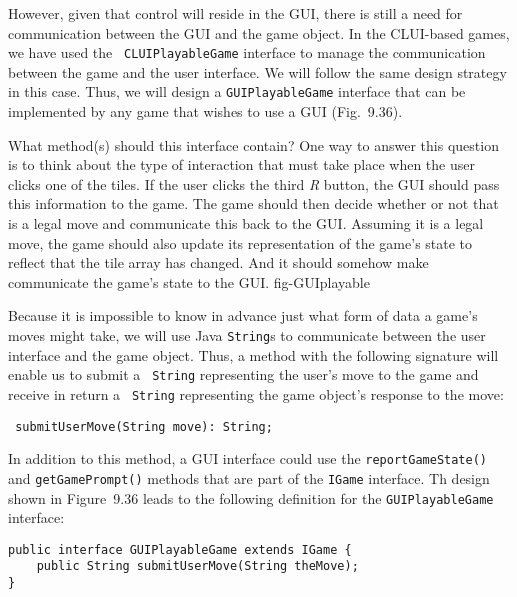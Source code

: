 However, given that control will reside in the GUI, there is still a
need for communication between the GUI and the game
object. In the CLUI-based games, we have used the {\tt
CLUIPlayableGame} interface to manage the communication between the
game and the user interface.  We will follow the same design strategy
in this case.  Thus, we will design a {\tt GUIPlayableGame} interface that
can be implemented by any game that wishes to use a GUI (Fig.~9.36).

What method(s) should this interface contain?  One way to answer this
question is to think about the type of interaction that must take
place when the user clicks  one of the tiles.  If the user clicks
the third {\em R} button, the GUI should pass this information to the
game. The game should then decide whether or not that is a legal move
and communicate this back to the GUI. Assuming it is a legal move, the
game should also update its representation of the game's state to
reflect that the tile array has changed. And it should somehow make
communicate the game's state to the GUI.
{fig-GUIplayable}


Because it is impossible to know in advance just what form of data a
game's moves might take, we will use Java {\tt String}s to communicate
between the user interface and the game object. Thus, a method with
the following signature will enable us to submit a {\tt
String} representing the user's move to the game  and receive in return a {\tt
String} representing the game object's response to the move:

\begin{jjjlisting}
\begin{lstlisting}
 submitUserMove(String move): String;
\end{lstlisting}
\end{jjjlisting}

\noindent In addition to this method, a GUI interface could use the
{\tt report\-Game\-State()} and {\tt get\-Game\-Prompt()} methods that are
part of the {\tt IGame} interface.  Th design shown in Figure~9.36
leads to the following definition for the {\tt GUIPlayableGame}
interface:

\begin{jjjlisting}
\begin{lstlisting}
public interface GUIPlayableGame extends IGame {
    public String submitUserMove(String theMove);
}
\end{lstlisting}
\end{jjjlisting}

